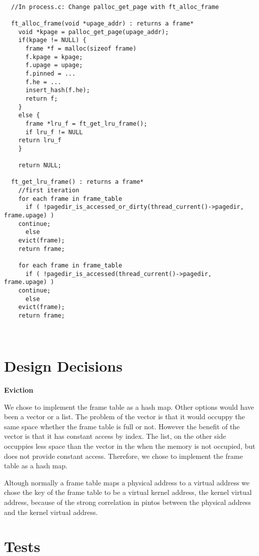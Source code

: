 \begin{lstlisting}

  //In process.c: Change palloc_get_page with ft_alloc_frame

  ft_alloc_frame(void *upage_addr) : returns a frame*
    void *kpage = palloc_get_page(upage_addr);
    if(kpage != NULL) {
      frame *f = malloc(sizeof frame)
      f.kpage = kpage;
      f.upage = upage;
      f.pinned = ...
      f.he = ...
      insert_hash(f.he);
      return f;
    }
    else {
      frame *lru_f = ft_get_lru_frame();
      if lru_f != NULL
	return lru_f
    }

    return NULL;

  ft_get_lru_frame() : returns a frame*
    //first iteration
    for each frame in frame_table
      if ( !pagedir_is_accessed_or_dirty(thread_current()->pagedir, frame.upage) )
	continue;
      else 
	evict(frame);
	return frame;
    
    for each frame in frame_table
      if ( !pagedir_is_accessed(thread_current()->pagedir, frame.upage) )
	continue;
      else 
	evict(frame);
	return frame;

  
\end{lstlisting}



\section{Design Decisions}

\textbf{Eviction}

We chose to implement the frame table as a hash map. Other options would have been a vector or a list. The problem of the vector is that it would occuppy the same space whether the frame table is full or not. However the benefit of the vector is that it has constant access by index. The list, on the other side occuppies less space than the vector in the when the memory is not occupied, but does not provide constant access. Therefore, we chose to implement the frame table as a hash map.

Altough normally a frame table maps a physical address to a virtual address we chose the key of the frame table to be a virtual kernel address, the kernel virtual address, because of the strong correlation in pintos between the physical address and the kernel virtual address.

\section{Tests}

